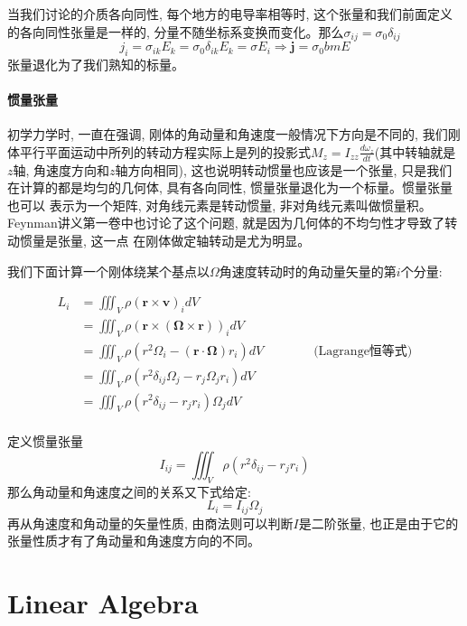 当我们讨论的介质各向同性, 每个地方的电导率相等时, 这个张量和我们前面定义的各向同性张量是一样的, 分量不随坐标系变换而变化。那么$\sigma_{ij}=\sigma_0\delta_{ij}$
$$j_i=\sigma_{ik}E_k=\sigma_0\delta_{ik}E_k=\sigma E_i\Rightarrow\bm{j}=\sigma_0bm{E}$$张量退化为了我们熟知的标量。
\subsubsection*{惯量张量}
初学力学时, 一直在强调, 刚体的角动量和角速度一般情况下方向是不同的, 我们刚体平行平面运动中所列的转动方程实际上是列的投影式$M_z=I_{zz}\frac{d\omega_z}{dt}$(其中转轴就是
$z$轴, 角速度方向和$z$轴方向相同), 这也说明转动惯量也应该是一个张量, 只是我们在计算的都是均匀的几何体, 具有各向同性, 惯量张量退化为一个标量。惯量张量也可以
表示为一个矩阵, 对角线元素是转动惯量, 非对角线元素叫做惯量积。Feynman讲义第一卷中也讨论了这个问题, 就是因为几何体的不均匀性才导致了转动惯量是张量, 这一点
在刚体做定轴转动是尤为明显。

我们下面计算一个刚体绕某个基点以$\Omega$角速度转动时的角动量矢量的第$i$个分量:
\begin{center}
    \begin{equation*}
        \displaystyle
        \begin{split}
            L_i&=\iiint_V \rho(\bm{r}\times\bm{v})_idV\\
               &=\iiint_V \rho(\bm{r}\times\left(\bm{\Omega}\times\bm{r}\right))_idV\\
               &=\iiint_V \rho\left(r^2\Omega_i-\left(\bm{r}\cdot\bm{\Omega}\right)r_i\right)dV \qquad\qquad\text{(Lagrange恒等式)}\\
               &=\iiint_V \rho\left(r^2\delta_{ij}\Omega_j-r_j\Omega_jr_i\right)dV\\
               &=\iiint_V \rho\left(r^2\delta_{ij}-r_jr_i\right)\Omega_jdV\\
        \end{split}
    \end{equation*}
\end{center}    
定义惯量张量$$I_{ij}=\iiint_V \rho\left(r^2\delta_{ij}-r_jr_i\right)$$
那么角动量和角速度之间的关系又下式给定:
$$L_i=I_{ij}\Omega_j$$
再从角速度和角动量的矢量性质, 由商法则可以判断$I$是二阶张量, 也正是由于它的张量性质才有了角动量和角速度方向的不同。



\chapter{Linear Algebra}

